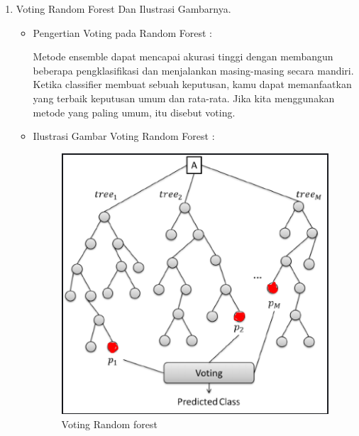 \begin{enumerate}
\par
\par
\item Voting Random Forest Dan Ilustrasi Gambarnya.
\par
\begin{itemize}
\item Pengertian Voting pada Random Forest	:
\par Metode ensemble dapat mencapai akurasi tinggi dengan membangun beberapa pengklasifikasi dan menjalankan
masing-masing secara mandiri. Ketika classifier membuat sebuah keputusan, kamu dapat memanfaatkan yang terbaik
keputusan umum dan rata-rata. Jika kita menggunakan metode yang paling umum, itu disebut voting.
\item Ilustrasi Gambar Voting Random Forest :
\begin{figure}[ht]
\centering
\includegraphics[scale=1]{figures/AIP/asm2.PNG}
\caption{Voting Random forest}
\label{contoh}
\end{figure}
\end{itemize}
\end{enumerate}

